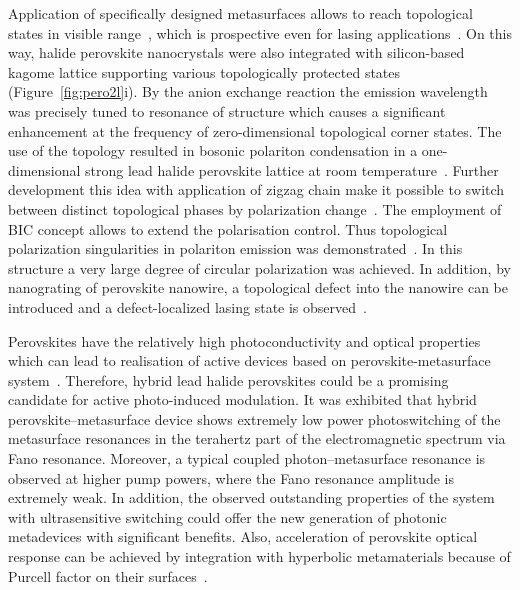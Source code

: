 \documentclass[journal=chreay,manuscript=review]{achemso}
\begin{document}
Application of specifically designed metasurfaces allows to reach topological states in visible range~\cite{lu2014topological}, which is prospective even for lasing applications~\cite{bandres2018topological,zeng2020electrically}. On this way, halide perovskite nanocrystals were also integrated with silicon-based kagome lattice supporting various topologically protected states~\cite{berestennikov2021enhanced} (Figure~\ref{fig:pero2l}i). By the anion exchange reaction the emission wavelength was precisely tuned to resonance of structure which causes a significant enhancement at the frequency of zero-dimensional topological corner states. The use of the topology resulted in bosonic polariton condensation in a one-dimensional strong lead halide perovskite lattice at room temperature~\cite{su2020observation}. Further development this idea with application of zigzag chain make it possible to switch between distinct topological phases by polarization change~\cite{su2021optical}. The employment of BIC concept allows to extend the polarisation control. Thus topological polarization singularities in polariton emission was demonstrated~\cite{kim2021topological}. In this structure a very large degree of circular polarization was achieved. In addition, by nanograting of perovskite nanowire, a topological defect into the nanowire can be introduced and a defect-localized lasing state is observed~\cite{berestennikov2020optical}.


Perovskites have the relatively high photoconductivity and optical properties which can lead to realisation of active devices based on perovskite-metasurface system~\cite{manjappa2017hybrid}. Therefore, hybrid lead halide perovskites could be a promising candidate for active photo-induced modulation. It was exhibited that  hybrid perovskite–metasurface device shows extremely low power photoswitching of the metasurface resonances in the terahertz part of the electromagnetic spectrum via Fano resonance. Moreover, a typical coupled photon–metasurface resonance is observed at higher pump powers, where the Fano resonance amplitude is extremely weak. In addition, the observed outstanding properties of the system with ultrasensitive switching could offer the new generation of photonic metadevices with significant benefits. Also, acceleration of perovskite optical response can be achieved by integration with hyperbolic metamaterials because of Purcell factor on their surfaces~\cite{adl2020purcell, li2020active, tonkaev2021acceleration}.
\end{document}
